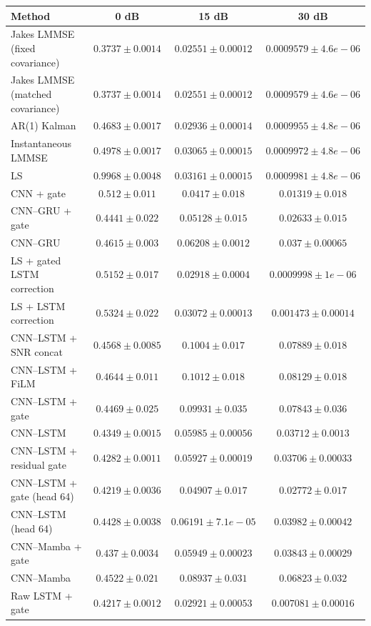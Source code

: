 \begin{tabular}{lccc}
\hline
Method & 0 dB & 15 dB & 30 dB \\
\hline
Jakes LMMSE (fixed covariance) & $0.3737 \pm 0.0014$ & $0.02551 \pm 0.00012$ & $0.0009579 \pm 4.6e-06$ \\
Jakes LMMSE (matched covariance) & $0.3737 \pm 0.0014$ & $0.02551 \pm 0.00012$ & $0.0009579 \pm 4.6e-06$ \\
AR(1) Kalman & $0.4683 \pm 0.0017$ & $0.02936 \pm 0.00014$ & $0.0009955 \pm 4.8e-06$ \\
Instantaneous LMMSE & $0.4978 \pm 0.0017$ & $0.03065 \pm 0.00015$ & $0.0009972 \pm 4.8e-06$ \\
LS & $0.9968 \pm 0.0048$ & $0.03161 \pm 0.00015$ & $0.0009981 \pm 4.8e-06$ \\
CNN + gate & $0.512 \pm 0.011$ & $0.0417 \pm 0.018$ & $0.01319 \pm 0.018$ \\
CNN--GRU + gate & $0.4441 \pm 0.022$ & $0.05128 \pm 0.015$ & $0.02633 \pm 0.015$ \\
CNN--GRU & $0.4615 \pm 0.003$ & $0.06208 \pm 0.0012$ & $0.037 \pm 0.00065$ \\
LS + gated LSTM correction & $0.5152 \pm 0.017$ & $0.02918 \pm 0.0004$ & $0.0009998 \pm 1e-06$ \\
LS + LSTM correction & $0.5324 \pm 0.022$ & $0.03072 \pm 0.00013$ & $0.001473 \pm 0.00014$ \\
CNN--LSTM + SNR concat & $0.4568 \pm 0.0085$ & $0.1004 \pm 0.017$ & $0.07889 \pm 0.018$ \\
CNN--LSTM + FiLM & $0.4644 \pm 0.011$ & $0.1012 \pm 0.018$ & $0.08129 \pm 0.018$ \\
CNN--LSTM + gate & $0.4469 \pm 0.025$ & $0.09931 \pm 0.035$ & $0.07843 \pm 0.036$ \\
CNN--LSTM & $0.4349 \pm 0.0015$ & $0.05985 \pm 0.00056$ & $0.03712 \pm 0.0013$ \\
CNN--LSTM + residual gate & $0.4282 \pm 0.0011$ & $0.05927 \pm 0.00019$ & $0.03706 \pm 0.00033$ \\
CNN--LSTM + gate (head 64) & $0.4219 \pm 0.0036$ & $0.04907 \pm 0.017$ & $0.02772 \pm 0.017$ \\
CNN--LSTM (head 64) & $0.4428 \pm 0.0038$ & $0.06191 \pm 7.1e-05$ & $0.03982 \pm 0.00042$ \\
CNN--Mamba + gate & $0.437 \pm 0.0034$ & $0.05949 \pm 0.00023$ & $0.03843 \pm 0.00029$ \\
CNN--Mamba & $0.4522 \pm 0.021$ & $0.08937 \pm 0.031$ & $0.06823 \pm 0.032$ \\
Raw LSTM + gate & $0.4217 \pm 0.0012$ & $0.02921 \pm 0.00053$ & $0.007081 \pm 0.00016$ \\
\hline
\end{tabular}
